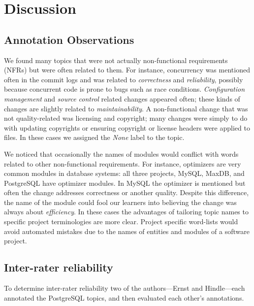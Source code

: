 \documentclass[smallextended]{svjour3}       %
\begin{document}
\section{Discussion}
\label{sec:limit}

\subsection{Annotation Observations}
We found many topics that were not actually non-functional requirements (NFRs) but were often related to them. 
For instance, concurrency was mentioned often in the commit logs and
was related to \emph{correctness} and \emph{reliability}, possibly because concurrent code is prone to bugs such as race conditions. %
\emph{Configuration management} and \emph{source control} related changes appeared often; %
these kinds of changes are slightly related to \emph{maintainability}. 
A non-functional change that was not quality-related was licensing and
copyright; many changes were simply to do with updating copyrights or
ensuring copyright or license headers were applied to files. In these
cases we assigned the \emph{None} label to the topic.

We noticed that occasionally the names of modules would conflict with words related to other non-functional requirements. 
For instance, optimizers are very common modules in database systems:
all three projects, MySQL, MaxDB, and PostgreSQL have optimizer modules. 
In MySQL the optimizer is mentioned but often the change addresses  correctness or another quality. 
Despite this difference, the name of the module could fool our learners into believing the change was always about \emph{efficiency}. 
In these cases the advantages of tailoring topic names to specific project terminologies are more clear. 
Project specific word-lists would avoid automated mistakes due to the names of entities and modules of a software project.

\subsection{Inter-rater reliability}

To determine inter-rater reliability two of the authors---Ernst and Hindle---each annotated the PostgreSQL topics,
and then evaluated each other's annotations.

\end{document}
